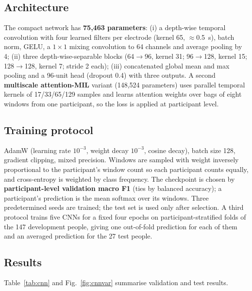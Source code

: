 \documentclass[10pt,twocolumn,a4paper]{article}
\begin{document}
\subsection{Architecture}
The compact network has \textbf{75,463 parameters}: (i) a depth-wise temporal convolution with four learned filters per electrode (kernel 65, $\approx$0.5~s), batch norm, GELU, a $1{\times}1$ mixing convolution to 64 channels and average pooling by 4; (ii) three depth-wise-separable blocks (64$\to$96, kernel 31; 96$\to$128, kernel 15; 128$\to$128, kernel 7; stride 2 each); (iii) concatenated global mean and max pooling and a 96-unit head (dropout 0.4) with three outputs. A second \textbf{multiscale attention-MIL} variant (148,524 parameters) uses parallel temporal kernels of 17/33/65/129 samples and learns attention weights \cite{ilse2018} over bags of eight windows from one participant, so the loss is applied at participant level.

\subsection{Training protocol}
AdamW (learning rate $10^{-3}$, weight decay $10^{-3}$, cosine decay), batch size 128, gradient clipping, mixed precision. Windows are sampled with weight inversely proportional to the participant's window count so each participant counts equally, and cross-entropy is weighted by class frequency. The checkpoint is chosen by \textbf{participant-level validation macro F1} (ties by balanced accuracy); a participant's prediction is the mean softmax over its windows. Three predetermined seeds are trained; the test set is used only after selection. A third protocol trains five CNNs for a fixed four epochs on participant-stratified folds of the 147 development people, giving one out-of-fold prediction for each of them and an averaged prediction for the 27 test people.

\subsection{Results}
\label{sec:cnnresults}
Table~\ref{tab:cnn} and Fig.~\ref{fig:cnnvar} summarise validation and test results.
\end{document}
